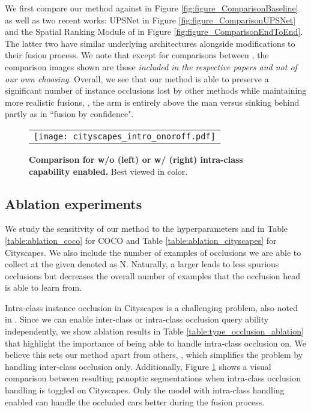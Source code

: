 \documentclass[10pt,twocolumn,letterpaper]{article}
\begin{document}
We first compare our method against \cite{kirillov2019panoptic} in Figure \ref{fig:figure_ComparisonBaseline} as well as two recent works: UPSNet \cite{xiong2019upsnet} in Figure \ref{fig:figure_ComparisonUPSNet} and the Spatial Ranking Module of \cite{liu2019end} in Figure \ref{fig:figure_ComparisonEndToEnd}. The latter two have similar underlying architectures alongside modifications to their fusion process. We note that except for comparisons between \cite{kirillov2019panoptic}, the comparison images shown are those \textit{included in the respective papers and not of our own choosing}. Overall, we see that our method is able to preserve a significant number of instance occlusions lost by other methods while maintaining more realistic fusions, \eg, the arm is entirely above the man versus sinking behind partly as in ``fusion by confidence".

\vspace{1mm}




\begin{figure}[!htp]
\begin{center}
\begin{tabular} {c}
\texttt{[image: cityscapes\_intro\_onoroff.pdf]}
\end{tabular}
\end{center}
\vspace{-7mm}
\caption{\textbf{Comparison for w/o (left) or w/ (right) intra-class capability enabled.} Best viewed in color.} 
\vspace{-3mm}
\label{fig:intra-class-cityscapes}
\end{figure}


\subsection{Ablation experiments} \label{sec:ablation}

We study the sensitivity of our method to the hyperparameters  and  in Table \ref{table:ablation_coco} for COCO and Table \ref{table:ablation_cityscapes} for Cityscapes. We also include the number of examples of occlusions we are able to collect at the given  denoted as N. Naturally, a larger  leads to less spurious occlusions but decreases the overall number of examples that the occlusion head is able to learn from.

Intra-class instance occlusion in Cityscapes is a challenging problem, also noted in \cite{he2017mask}. Since we can enable inter-class or intra-class occlusion query ability independently, we show ablation results in Table \ref{table:type_occlusion_ablation} that highlight the importance of being able to handle intra-class occlusion on. We believe this sets our method apart from others, \eg, \cite{liu2019end} which simplifies the problem by handling inter-class occlusion only. Additionally, Figure \ref{fig:intra-class-cityscapes} shows a visual comparison between resulting panoptic segmentations when intra-class occlusion handling is toggled on Cityscapes. Only the model with intra-class handling enabled can handle the occluded cars better during the fusion process.
\end{document}
